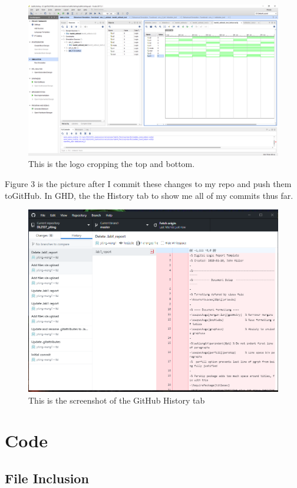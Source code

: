 \documentclass[11pt]{article}
\newcommand{\Verilog}[2][]{%
	
}
\begin{document}
	\begin{figure}[ht]\centering
		\includegraphics[width=1.0\textwidth,trim=8cm 8cm 0cm 0cm,clip]{Lab1Table}
		\caption{This is the logo cropping the top and bottom.}
		\label{fig:another_image}
	\end{figure}

	Figure 3 is the picture after I commit these changes to my repo and push them toGitHub. In GHD, the the History tab to show me all of my commits thus far.\\
	\begin{figure}[ht]\centering
		\includegraphics[width=1.0\textwidth]{GitHub}
		\caption{This is the screenshot of the GitHub History tab}
		\label{fig:GitHub}
	\end{figure}



\section*{Code}

\subsection*{File Inclusion}
\Verilog[caption=lab1 example Verilog code,label=code:file_ex]{lab1_example_code.sv}
\end{document}
